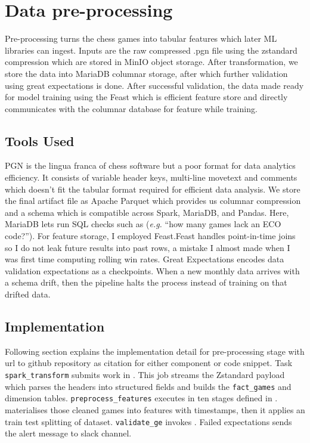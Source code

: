 \section{Data pre-processing}
\label{sec:preprocessing}
Pre-processing turns the chess games into tabular features which later ML libraries can ingest. Inputs are the raw compressed .pgn file using the zstandard compression which are stored in MinIO object storage. After transformation, we store the data into MariaDB columnar storage, after which further validation using great expectations is done. After successful validation, the data made ready for model training using the Feast which is efficient feature store and directly communicates with the columnar database for feature while training. 

\subsection{Tools Used}
PGN is the lingua franca of chess software but a poor format for data analytics efficiency. It consists of variable header keys, multi-line movetext and comments which doesn't fit the tabular format required for efficient data analysis. We store the final artifact file as Apache Parquet \parencite{apache_parquet} which provides us columnar compression and a schema which is compatible across Spark, MariaDB, and Pandas. Here, MariaDB lets run SQL checks such as (\emph{e.g.} ``how many games lack an ECO code?''). For feature storage, I employed Feast.Feast \parencite{feast} handles point-in-time joins so I do not leak future results into past rows, a mistake I almost made when I was first time computing rolling win rates. Great Expectations \parencite{great_expectations} encodes data validation expectations as a checkpoints. When a new monthly data arrives with a schema drift, then the pipeline halts the process instead of training on that drifted data.

\subsection{Implementation}
Following section explains the implementation detail for pre-processing stage with url to github repository as citation for either component or code snippet. Task \texttt{spark\_transform} submits work in . This job streams the Zstandard payload which parses the headers into structured fields and builds the \texttt{fact\_games} and dimension tables. \texttt{preprocess\_features} executes in ten stages defined in .  materialises those cleaned games into features with timestamps, then it applies an train test splitting of dataset. \texttt{validate\_ge} invokes . Failed expectations sends the alert message to slack channel. 





